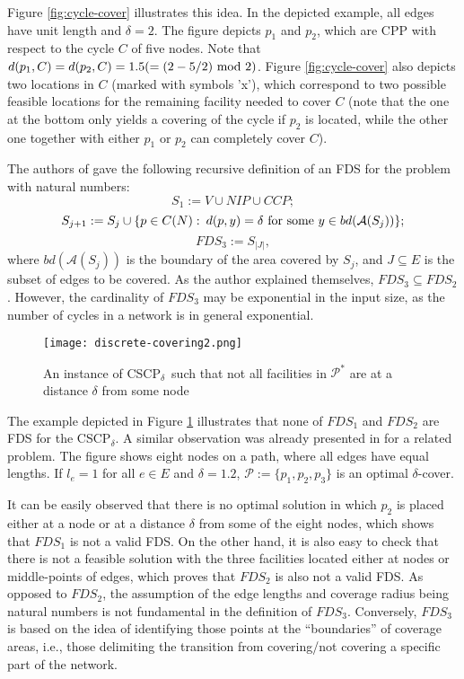 \documentclass[review]{elsarticle}
\newcommand{\cA}{{\mathcal A}}
\newcommand{\cP}{{\mathcal P}}
\newcommand{\dlt}{{\delta}}
\newcommand{\problem}{CSCP$_\dlt$}
\theoremstyle{definition}
\begin{document}
Figure \ref{fig:cycle-cover} illustrates this idea. In the depicted example, all edges have unit length and $\dlt=2$. The figure depicts $p_1$ and $p_2$, which are CPP with respect to the cycle $C$ of five nodes. Note that $d(p_1,C)=d(p_2,C)=1.5(=(2-5/2)\textup{ mod } 2)$. Figure \ref{fig:cycle-cover} also depicts two locations in $C$ (marked with symbols 'x'), which correspond to two possible feasible locations for the remaining facility needed to cover $C$ (note that the one at the bottom only yields a covering of the cycle if $p_2$ is located, while the other one together with either $p_1$ or $p_2$ can completely cover $C$).

The authors of \cite{Hamacher20} gave the following recursive definition of an FDS for the problem with natural numbers:
$$S_1:=V\cup NIP \cup CCP;$$
$$S_{j+1}:=S_j\cup\{p\in C(N):\: d(p,y)=\dlt \textup{ for some } y\in bd(\cA(S_j)) \};$$
$$FDS_3:=S_{|J|},$$
where $bd(\cA(S_j))$ is the boundary of the area covered by $S_j$, and  $J\subseteq E$ is the subset of edges to be covered. As the author explained themselves, $FDS_3\subseteq FDS_2$. However, the cardinality of $FDS_3$ may be exponential in the input size, as the number of cycles in a network is in general exponential.

\begin{figure}
	\centering
	\texttt{[image: discrete-covering2.png]}
	\caption{An instance of \problem\ such that not all facilities in $\mathcal{P}^*$ are at a distance $\dlt$ from some node}
	\label{fig:exDiscrete}
\end{figure}
The example depicted in Figure \ref{fig:exDiscrete} illustrates that none of $FDS_1$ and $FDS_2$ are FDS for the \problem. A similar observation was already presented in \cite{Kalsics} for a related problem. The figure shows eight nodes on a path, where all edges have equal lengths. If $l_e=1$ for all $e\in E$ and $\dlt=1.2$, $\cP:=\{p_1,p_2,p_3\}$ is an optimal $\dlt$-cover.

It can be easily observed that there is no optimal solution in which $p_2$ is placed either at a node or at a distance $\dlt$ from some of the eight nodes, which shows that $FDS_1$ is not a valid FDS. On the other hand, it is also easy to check that there is not a feasible solution with the three facilities located either at nodes or middle-points of edges, which proves that $FDS_2$ is also not a valid FDS. As opposed to $FDS_2$, the assumption of the edge lengths and coverage radius being natural numbers is not fundamental in the definition of $FDS_3$. Conversely, $FDS_3$ is based on the idea of identifying those points at the ``boundaries'' of coverage areas, i.e., those delimiting the transition from covering/not covering a specific part of the network.
\end{document}
